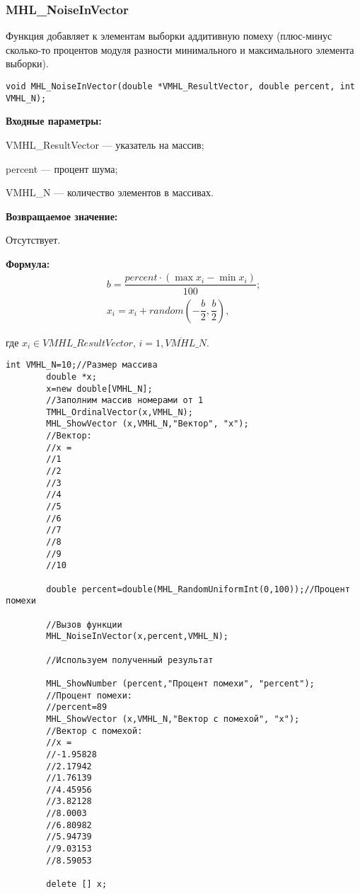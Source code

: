 \documentclass[a4paper,12pt]{article}
\begin{document}
\subsubsection{MHL\_NoiseInVector}\label{MHL_NoiseInVector}

Функция добавляет к элементам выборки аддитивную помеху (плюс-минус сколько-то процентов модуля разности минимального и максимального элемента выборки).


\begin{lstlisting}[label=code_syntax_MHL_NoiseInVector,caption=Синтаксис]
void MHL_NoiseInVector(double *VMHL_ResultVector, double percent, int VMHL_N);
\end{lstlisting}

\textbf{Входные параметры:}  

 VMHL\_ResultVector --- указатель на массив;
 
 percent --- процент шума;
 
 VMHL\_N --- количество элементов в массивах.

\textbf{Возвращаемое значение:}

Отсутствует.

\textbf{Формула:}
\begin{eqnarray*}
b=\dfrac{percent\cdot\left( \max{x_i}-\min{x_i}\right)}{100};\\
x_i=x_i+random \left( -\dfrac{b}{2},\dfrac{b}{2}\right),
\end{eqnarray*}

где $x_i \in VMHL\_ResultVector$, $i=\overline{1,VMHL\_N}$.


\begin{lstlisting}[label=code_use_MHL_NoiseInVector,caption=Пример использования]
        int VMHL_N=10;//Размер массива
        double *x;
        x=new double[VMHL_N];
        //Заполним массив номерами от 1
        TMHL_OrdinalVector(x,VMHL_N);
        MHL_ShowVector (x,VMHL_N,"Вектор", "x");
        //Вектор:
        //x =
        //1
        //2
        //3
        //4
        //5
        //6
        //7
        //8
        //9
        //10

        double percent=double(MHL_RandomUniformInt(0,100));//Процент помехи

        //Вызов функции
        MHL_NoiseInVector(x,percent,VMHL_N);

        //Используем полученный результат

        MHL_ShowNumber (percent,"Процент помехи", "percent");
        //Процент помехи:
        //percent=89
        MHL_ShowVector (x,VMHL_N,"Вектор с помехой", "x");
        //Вектор с помехой:
        //x =
        //-1.95828
        //2.17942
        //1.76139
        //4.45956
        //3.82128
        //8.0003
        //6.80982
        //5.94739
        //9.03153
        //8.59053

        delete [] x;
\end{lstlisting}
\end{document}
